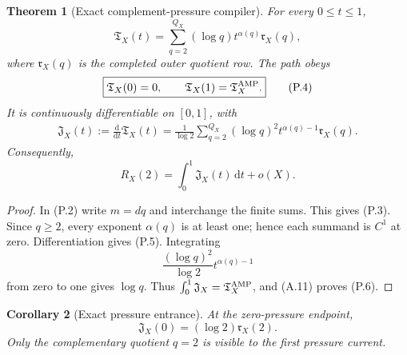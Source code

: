 \documentclass[11pt]{article}
\newtheorem{theorem}{Theorem}[section]
\newtheorem{corollary}[theorem]{Corollary}
\theoremstyle{definition}
\theoremstyle{remark}
\newcommand{\dd}{\mathrm d}
\begin{document}
\begin{theorem}[Exact complement-pressure compiler]
\label{thm:affpress-pressure-compiler}
For every $0\le t\le1$,
\begin{equation}
 \label{eq:affpress-pressure-quotient}
 \boxed{
 \mathfrak T_X(t)
 =\sum_{q=2}^{Q_X}
   (\log q)t^{\alpha(q)}\mathfrak r_X(q),}
 \tag{P.3}
\end{equation}
where $\mathfrak r_X(q)$ is the completed outer quotient row.  The path obeys
\begin{equation}
 \label{eq:affpress-pressure-boundary}
 \boxed{
 \mathfrak T_X(0)=0,
 \qquad
 \mathfrak T_X(1)=\mathfrak T_X^{\rm AMP}.}
 \tag{P.4}
\end{equation}
It is continuously differentiable on $[0,1]$, with
\begin{equation}
 \label{eq:affpress-pressure-current}
 \boxed{
 \begin{aligned}
 \mathfrak J_X(t)
 :=\frac{\dd}{\dd t}\mathfrak T_X(t)
 =\frac1{\log2}
 \sum_{q=2}^{Q_X}
 (\log q)^2t^{\alpha(q)-1}\mathfrak r_X(q).
 \end{aligned}}
 \tag{P.5}
\end{equation}
Consequently,
\begin{equation}
 \label{eq:affpress-pressure-integral}
 \boxed{
 R_X(2)
 =\int_0^1\mathfrak J_X(t)\,\dd t+o(X).}
 \tag{P.6}
\end{equation}
\end{theorem}

\begin{proof}
In \textup{(P.2)} write $m=dq$ and interchange the finite sums.  This gives
\textup{(P.3)}.  Since $q\ge2$, every exponent $\alpha(q)$ is at least one;
hence each summand is $C^1$ at zero.  Differentiation gives
\textup{(P.5)}.  Integrating
\[
 \frac{(\log q)^2}{\log2}t^{\alpha(q)-1}
\]
from zero to one gives $\log q$.  Thus
$\int_0^1\mathfrak J_X=\mathfrak T_X^{\rm AMP}$, and \textup{(A.11)} proves
\textup{(P.6)}.
\end{proof}

\begin{corollary}[Exact pressure entrance]
\label{cor:affpress-pressure-entrance}
At the zero-pressure endpoint,
\begin{equation}
 \label{eq:affpress-pressure-entrance}
 \boxed{
 \mathfrak J_X(0)
 =(\log2)\mathfrak r_X(2).}
 \tag{P.7}
\end{equation}
Only the complementary quotient $q=2$ is visible to the first pressure
current.
\end{corollary}
\end{document}
